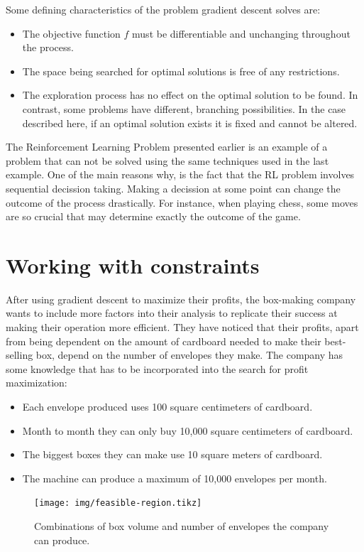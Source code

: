 Some defining characteristics of the problem gradient descent solves are:
\begin{itemize}
    \item The objective function $f$ must be differentiable and unchanging
        throughout the process.
    \item The space being searched for optimal solutions is free of any
        restrictions.
    \item The exploration process has no effect on the optimal solution to be
        found. In contrast, some problems have different, branching possibilities.
        In the case described here, if an optimal solution exists it is fixed and
        cannot be altered.
\end{itemize}
The Reinforcement Learning Problem presented earlier is an example of a problem
that can not be solved using the same techniques used in the last example. One
of the main reasons why, is the fact that the RL problem involves sequential
decission taking. Making a decission at some point can change the outcome of the
process drastically. For instance, when playing chess, some moves are so crucial
that may determine exactly the outcome of the game.

\section{Working with constraints}

After using gradient descent to maximize their profits, the box-making company
wants to include more factors into their analysis to replicate their success at
making their operation more efficient. They have noticed that their profits,
apart from being dependent on the amount of cardboard needed to make their
best-selling box, depend on the number of envelopes they make. The company has
some knowledge that has to be incorporated into the search for profit
maximization:
\begin{itemize}
    \item Each envelope produced uses 100 square centimeters of cardboard.
    \item Month to month they can only buy 10,000 square centimeters of cardboard.
    \item The biggest boxes they can make use 10 square meters of cardboard.
    \item The machine can produce a maximum of 10,000 envelopes per month.
\end{itemize}


\begin{figure}
   \centering
   \texttt{[image: img/feasible-region.tikz]} 
   \caption{Combinations of box volume and number of envelopes the company can produce.}
   \label{fig:feasible-region}
\end{figure}

